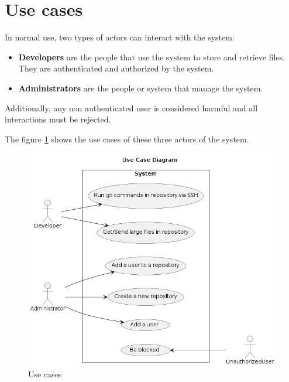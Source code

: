 \section{Use cases}

In normal use, two types of actors can interact with the system:

\begin{itemize}
    \item \textbf{Developers} are the people that use the system to store and retrieve files. They are authenticated and authorized by the system.
    \item \textbf{Administrators} are the people or system that manage the system.
\end{itemize}

Additionally, any non authenticated user is considered harmful and all interactions must be rejected.

The figure \ref{fig:use_cases} shows the use cases of these three actors of the system. 

\begin{figure}[h]
    \centering
    \includegraphics[width=\textwidth]{iteration_00/diagrams/use_cases.png}
    \caption{Use cases}
    \label{fig:use_cases}
\end{figure}
